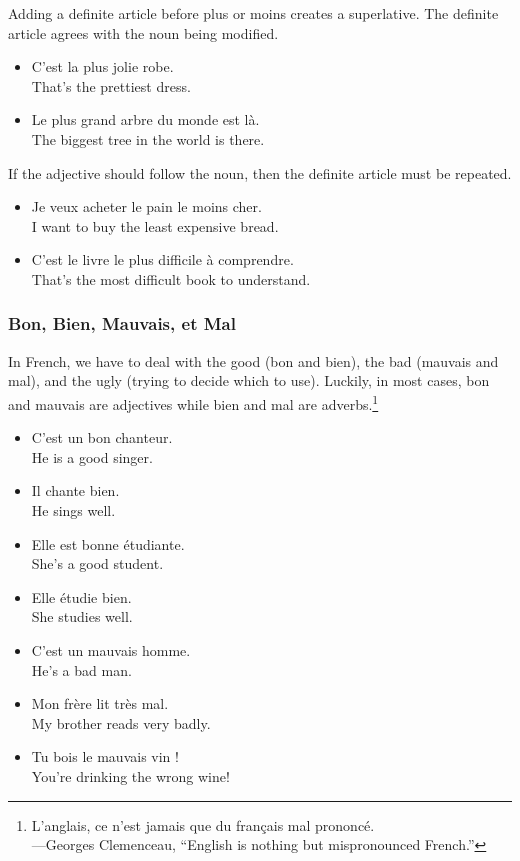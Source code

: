 Adding a definite article before plus or moins creates a superlative. The definite article agrees with the noun being modified.

\begin{itemize}
  \item  C'est la plus jolie robe. \\ That's the prettiest dress.
  \item  Le plus grand arbre du monde est l{\`a}. \\ The biggest tree in the world is there.
\end{itemize}

If the adjective should follow the noun, then the definite article must be repeated.

\begin{itemize}
  \item  Je veux acheter le pain le moins cher. \\ I want to buy the least expensive bread.
  \item  C'est le livre le plus difficile {\`a} comprendre. \\ That's the most difficult book to understand.
\end{itemize}

\subsubsection{Bon, Bien, Mauvais, et Mal}

In French, we have to deal with the good (bon and bien), the bad (mauvais and mal), and the ugly (trying to decide which to use). Luckily, in most cases, bon and mauvais are adjectives while bien and mal are adverbs.\footnote{L'anglais, ce n'est jamais que du fran{\c c}ais mal prononc{\'e}. \\ ---Georges Clemenceau, ``English is nothing but mispronounced French.''}

\begin{itemize}
  \item  C'est un bon chanteur. \\ He is a good singer.
  \item  Il chante bien. \\ He sings well.
  \item  Elle est bonne {\'e}tudiante. \\ She's a good student.
  \item  Elle {\'e}tudie bien. \\ She studies well.
  \item  C'est un mauvais homme. \\ He's a bad man.
  \item  Mon fr{\`e}re lit tr{\`e}s mal. \\ My brother reads very badly.
  \item  Tu bois le mauvais vin ! \\ You're drinking the wrong wine!
\end{itemize}

